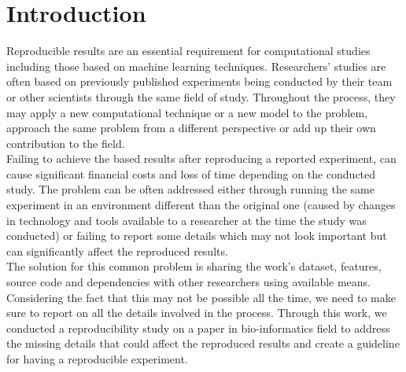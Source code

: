 \section {Introduction}


Reproducible results are an essential requirement for computational studies including those based on machine learning techniques. 
Researchers' studies are often based on previously published experiments being conducted by their team or other scientists 
through the same field of study. 
Throughout the process, they may apply a new computational technique or a new model to the problem, 
approach the same problem from a different perspective or add up their own contribution to the field. \\

Failing to achieve the based results after reproducing a reported experiment, can cause significant financial costs 
and loss of time depending on the conducted study. The problem can be often addressed either through running the same 
experiment in an environment different than the original one (caused by changes in technology and tools available to a 
researcher at the time the study was conducted) or failing to report some details which may not look important but 
can significantly affect the reproduced results. \\

The solution for this common problem is sharing the work's dataset, features, source code and dependencies with other 
researchers using available means. Considering the fact that this may not be possible all the time, we need to make 
sure to report on all the details involved in the process. Through this work, we conducted a reproducibility study on a paper 
in bio-informatics field to address the missing details that could affect the reproduced results and create a guideline for 
having a reproducible experiment. 
